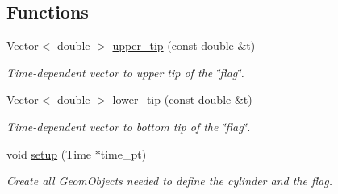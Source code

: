 \subsection*{Functions}
\begin{DoxyCompactItemize}
\item 
Vector$<$ double $>$ \hyperlink{namespaceFlag__definition_a6af3444eee77be503be4aa8c2ef47c13}{upper\+\_\+tip} (const double \&t)
\begin{DoxyCompactList}\small\item\em Time-\/dependent vector to upper tip of the \char`\"{}flag\char`\"{}. \end{DoxyCompactList}\item 
Vector$<$ double $>$ \hyperlink{namespaceFlag__definition_a91eabcfac65c509ab3448d82db1eb988}{lower\+\_\+tip} (const double \&t)
\begin{DoxyCompactList}\small\item\em Time-\/dependent vector to bottom tip of the \char`\"{}flag\char`\"{}. \end{DoxyCompactList}\item 
void \hyperlink{namespaceFlag__definition_a61a03bffd4a34950ef9892be53c49f89}{setup} (Time $\ast$time\+\_\+pt)
\begin{DoxyCompactList}\small\item\em Create all Geom\+Objects needed to define the cylinder and the flag. \end{DoxyCompactList}\end{DoxyCompactItemize}
